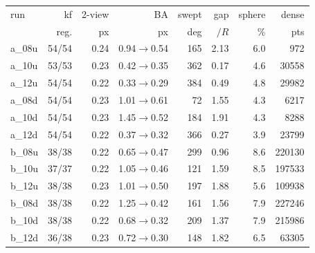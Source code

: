 \begin{tabular}{@{}lrrrrrrr@{}}
\hline
run & kf & 2-view & BA & swept & gap & sphere & dense \\
 & reg. & px & px & deg & $/R$ & \% & pts \\
\hline
a\_08u & 54/54 & 0.24 & 0.94$\to$0.54 & 165 & 2.13 & 6.0 & 972 \\
a\_10u & 53/53 & 0.23 & 0.42$\to$0.35 & 362 & 0.17 & 4.6 & 30558 \\
a\_12u & 54/54 & 0.22 & 0.33$\to$0.29 & 384 & 0.49 & 4.8 & 29982 \\
a\_08d & 54/54 & 0.23 & 1.01$\to$0.61 & 72 & 1.55 & 4.3 & 6217 \\
a\_10d & 54/54 & 0.23 & 1.45$\to$0.52 & 184 & 1.91 & 4.3 & 8288 \\
a\_12d & 54/54 & 0.22 & 0.37$\to$0.32 & 366 & 0.27 & 3.9 & 23799 \\
\hline
b\_08u & 38/38 & 0.22 & 0.65$\to$0.47 & 299 & 0.96 & 8.6 & 220130 \\
b\_10u & 37/37 & 0.22 & 1.05$\to$0.46 & 121 & 1.59 & 8.5 & 197533 \\
b\_12u & 38/38 & 0.23 & 1.01$\to$0.50 & 197 & 1.88 & 5.6 & 109938 \\
b\_08d & 38/38 & 0.22 & 1.25$\to$0.42 & 161 & 1.56 & 7.9 & 227246 \\
b\_10d & 38/38 & 0.22 & 0.68$\to$0.32 & 209 & 1.37 & 7.9 & 215986 \\
b\_12d & 36/38 & 0.23 & 0.72$\to$0.30 & 148 & 1.82 & 6.5 & 63305 \\
\hline
\end{tabular}
